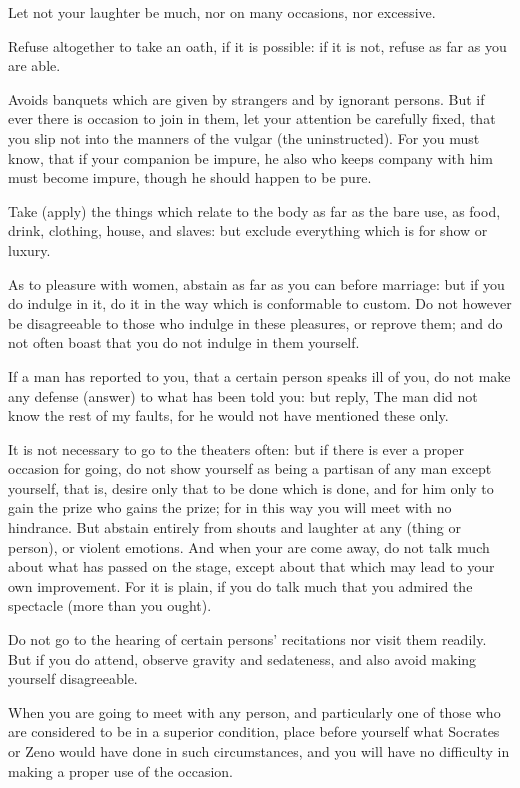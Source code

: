 Let not your laughter be much, nor on many occasions, nor excessive.

Refuse altogether to take an oath, if it is possible: if it is not, refuse as far as you are able.

Avoids banquets which are given by strangers and by ignorant persons. But if ever there is occasion to join in them, let your attention be carefully fixed, that you slip not into the manners of the vulgar (the uninstructed). For you must know, that if your companion be impure, he also who keeps company with him must become impure, though he should happen to be pure.

Take (apply) the things which relate to the body as far as the bare use, as food, drink, clothing, house, and slaves: but exclude everything which is for show or luxury.

As to pleasure with women, abstain as far as you can before marriage: but if you do indulge in it, do it in the way which is conformable to custom. Do not however be disagreeable to those who indulge in these pleasures, or reprove them; and do not often boast that you do not indulge in them yourself.

If a man has reported to you, that a certain person speaks ill of you, do not make any defense (answer) to what has been told you: but reply, The man did not know the rest of my faults, for he would not have mentioned these only.

It is not necessary to go to the theaters often: but if there is ever a proper occasion for going, do not show yourself as being a partisan of any man except yourself, that is, desire only that to be done which is done, and for him only to gain the prize who gains the prize; for in this way you will meet with no hindrance. But abstain entirely from shouts and laughter at any (thing or person), or violent emotions. And when your are come away, do not talk much about what has passed on the stage, except about that which may lead to your own improvement. For it is plain, if you do talk much that you admired the spectacle (more than you ought).

Do not go to the hearing of certain persons' recitations nor visit them readily. But if you do attend, observe gravity and sedateness, and also avoid making yourself disagreeable.

When you are going to meet with any person, and particularly one of those who are considered to be in a superior condition, place before yourself what Socrates or Zeno would have done in such circumstances, and you will have no difficulty in making a proper use of the occasion.

